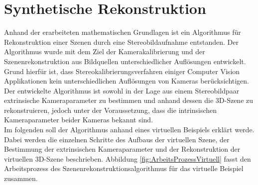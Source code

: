 \chapter{Synthetische Rekonstruktion}
\label{sec:minimal} 

Anhand der erarbeiteten mathematischen Grundlagen ist ein Algorithmus für Rekonstruktion einer Szenen durch eine Stereobildaufnahme entstanden. Der Algorithmus wurde mit dem Ziel der Kamerakalibrierung und der Szenenrekonstruktion aus Bildquellen unterschiedlicher Auflösungen entwickelt. Grund hierfür ist, dass Stereokalibrierungsverfahren einiger Computer Vision Applikationen kein unterschiedlichen Auflösungen von Kameras berücksichtigen.
Der entwickelte Algorithmus ist sowohl in der Lage aus einem Stereobildpaar extrinsische Kameraparameter zu bestimmen und anhand dessen die 3D-Szene zu rekonstruieren, jedoch unter der Voraussetzung, dass die intrinsischen Kameraparameter beider Kameras bekannt sind.\\

Im folgenden soll der Algorithmus anhand eines virtuellen Beispiels erklärt werde. Dabei werden die einzelnen Schritte des Aufbaus der virtuellen Szene, der Bestimmung der extrinsischen Kameraparameter und der Rekonstruktion der virtuellen 3D-Szene beschrieben. Abbildung \ref{fig:ArbeitsProzessVirtuell} fasst den Arbeitsprozess des Szenenrekonstruktionsalgorithmus für das virtuelle Beispiel zusammen. \\


%
%

